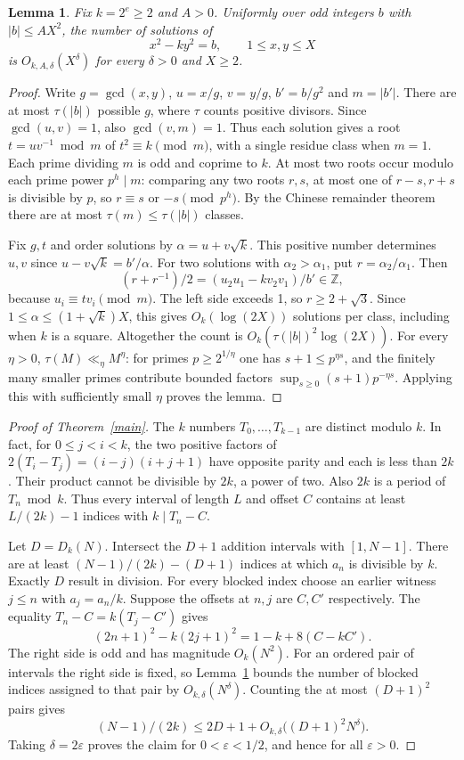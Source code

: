\documentclass[10pt]{article}
\newtheorem{lemma}[theorem]{Lemma}
\newcommand{\Z}{\mathbb Z}
\begin{document}
\begin{lemma}\label{pell}
Fix $k=2^e\ge2$ and $A>0$. Uniformly over odd integers $b$ with $|b|\le A X^2$, the number of solutions of
\[
 x^2-ky^2=b,\qquad 1\le x,y\le X
\]
is $O_{k,A,\delta}(X^\delta)$ for every $\delta>0$ and $X\ge2$.
\end{lemma}
\begin{proof}
Write $g=\gcd(x,y)$, $u=x/g$, $v=y/g$, $b'=b/g^2$ and $m=|b'|$.
There are at most $\tau(|b|)$ possible $g$, where $\tau$ counts positive divisors. Since $\gcd(u,v)=1$, also $\gcd(v,m)=1$. Thus each solution gives a root $t=uv^{-1}\bmod m$ of $t^2\equiv k\pmod m$, with a single residue class when $m=1$. Each prime dividing $m$ is odd and coprime to $k$. At most two roots occur modulo each prime power $p^h\mid m$: comparing any two roots $r,s$, at most one of $r-s,r+s$ is divisible by $p$, so $r\equiv s$ or $-s\pmod{p^h}$. By the Chinese remainder theorem there are at most $\tau(m)\le\tau(|b|)$ classes.

Fix $g,t$ and order solutions by $\alpha=u+v\sqrt k$. This positive number determines $u,v$ since $u-v\sqrt k=b'/\alpha$. For two solutions with $\alpha_2>\alpha_1$, put $r=\alpha_2/\alpha_1$. Then
\[
 (r+r^{-1})/2=(u_2u_1-kv_2v_1)/b'\in\Z,
\]
because $u_i\equiv t v_i\pmod m$. The left side exceeds 1, so $r\ge2+\sqrt3$. Since $1\le\alpha\le(1+\sqrt k)X$, this gives $O_k(\log(2X))$ solutions per class, including when $k$ is a square. Altogether the count is $O_k(\tau(|b|)^2\log(2X))$. For every $\eta>0$, $\tau(M)\ll_\eta M^\eta$: for primes $p\ge2^{1/\eta}$ one has $s+1\le p^{\eta s}$, and the finitely many smaller primes contribute bounded factors $\sup_{s\ge0}(s+1)p^{-\eta s}$. Applying this with sufficiently small $\eta$ proves the lemma.
\end{proof}

\begin{proof}[Proof of Theorem~\ref{main}]
The $k$ numbers $T_0,\ldots,T_{k-1}$ are distinct modulo $k$. In fact, for $0\le j<i<k$, the two positive factors of $2(T_i-T_j)=(i-j)(i+j+1)$ have opposite parity and each is less than $2k$. Their product cannot be divisible by $2k$, a power of two. Also $2k$ is a period of $T_n\bmod k$. Thus every interval of length $L$ and offset $C$ contains at least $L/(2k)-1$ indices with $k\mid T_n-C$.

Let $D=D_k(N)$. Intersect the $D+1$ addition intervals with $[1,N-1]$. There are at least $(N-1)/(2k)-(D+1)$ indices at which $a_n$ is divisible by $k$. Exactly $D$ result in division. For every blocked index choose an earlier witness $j\le n$ with $a_j=a_n/k$. Suppose the offsets at $n,j$ are $C,C'$ respectively. The equality $T_n-C=k(T_j-C')$ gives
\[
 (2n+1)^2-k(2j+1)^2=1-k+8(C-kC').
\]
The right side is odd and has magnitude $O_k(N^2)$. For an ordered pair of intervals the right side is fixed, so Lemma~\ref{pell} bounds the number of blocked indices assigned to that pair by $O_{k,\delta}(N^\delta)$. Counting the at most $(D+1)^2$ pairs gives
\[
 (N-1)/(2k)\le 2D+1+O_{k,\delta}\big((D+1)^2N^\delta\big).
\]
Taking $\delta=2\varepsilon$ proves the claim for $0<\varepsilon<1/2$, and hence for all $\varepsilon>0$.
\end{proof}
\end{document}
